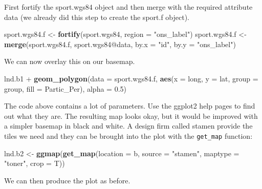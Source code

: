 \documentclass[]{article}
\newenvironment{Shaded}{}{}
\newcommand{\KeywordTok}[1]{\textcolor[rgb]{0.00,0.44,0.13}{\textbf{{#1}}}}
\newcommand{\DataTypeTok}[1]{\textcolor[rgb]{0.56,0.13,0.00}{{#1}}}
\newcommand{\FloatTok}[1]{\textcolor[rgb]{0.25,0.63,0.44}{{#1}}}
\newcommand{\StringTok}[1]{\textcolor[rgb]{0.25,0.44,0.63}{{#1}}}
\newcommand{\NormalTok}[1]{{#1}}
\begin{document}
First fortify the sport.wgs84 object and then merge with the required
attribute data (we already did this step to create the sport.f object).

\begin{Shaded}
\begin{Highlighting}[]
\NormalTok{sport.wgs84.f <- }\KeywordTok{fortify}\NormalTok{(sport.wgs84, }\DataTypeTok{region =} \StringTok{"ons_label"}\NormalTok{)}
\NormalTok{sport.wgs84.f <- }\KeywordTok{merge}\NormalTok{(sport.wgs84.f, sport.wgs84@data, }\DataTypeTok{by.x =} \StringTok{"id"}\NormalTok{, }\DataTypeTok{by.y =} \StringTok{"ons_label"}\NormalTok{)}
\end{Highlighting}
\end{Shaded}
We can now overlay this on our basemap.

\begin{Shaded}
\begin{Highlighting}[]
\NormalTok{lnd.b1 + }\KeywordTok{geom_polygon}\NormalTok{(}\DataTypeTok{data =} \NormalTok{sport.wgs84.f, }\KeywordTok{aes}\NormalTok{(}\DataTypeTok{x =} \NormalTok{long, }\DataTypeTok{y =} \NormalTok{lat, }\DataTypeTok{group =} \NormalTok{group, }
    \DataTypeTok{fill =} \NormalTok{Partic_Per), }\DataTypeTok{alpha =} \FloatTok{0.5}\NormalTok{)}
\end{Highlighting}
\end{Shaded}
The code above contains a lot of parameters. Use the ggplot2 help pages
to find out what they are. The resulting map looks okay, but it would be
improved with a simpler basemap in black and white. A design firm called
stamen provide the tiles we need and they can be brought into the plot
with the \texttt{get\_map} function:

\begin{Shaded}
\begin{Highlighting}[]
\NormalTok{lnd.b2 <- }\KeywordTok{ggmap}\NormalTok{(}\KeywordTok{get_map}\NormalTok{(}\DataTypeTok{location =} \NormalTok{b, }\DataTypeTok{source =} \StringTok{"stamen"}\NormalTok{, }\DataTypeTok{maptype =} \StringTok{"toner"}\NormalTok{, }
    \DataTypeTok{crop =} \NormalTok{T))}
\end{Highlighting}
\end{Shaded}
We can then produce the plot as before.
\end{document}
